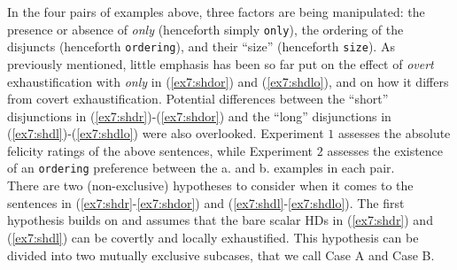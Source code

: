 In the four pairs of examples above, three factors are being manipulated: the presence or absence of \textit{only} (henceforth simply \texttt{only}), the ordering of the disjuncts (henceforth \texttt{ordering}), and their ``size'' (henceforth \texttt{size}). As previously mentioned, little emphasis has been so far put on the effect of \textit{overt} exhaustification with \textit{only} in (\ref{ex7:shdor}) and (\ref{ex7:shdlo}), and on how it differs from covert exhaustification. Potential differences between the ``short'' disjunctions in (\ref{ex7:shdr})-(\ref{ex7:shdor}) and the ``long'' disjunctions in (\ref{ex7:shdl})-(\ref{ex7:shdlo}) were also overlooked. Experiment $1$ assesses the absolute felicity ratings of the above sentences, while Experiment $2$ assesses the existence of an \texttt{ordering} preference between the a. and b. examples in each pair.\\

There are two (non-exclusive) hypotheses to consider when it comes to the sentences in (\ref{ex7:shdr}-\ref{ex7:shdor}) and (\ref{ex7:shdl}-\ref{ex7:shdlo}). The first hypothesis builds on \textcite{Fox2007,Chierchia2009} and assumes that the bare scalar HDs in (\ref{ex7:shdr}) and (\ref{ex7:shdl}) can be covertly and locally exhaustified. This hypothesis can be divided into two mutually exclusive subcases, that we call Case A and Case B.

